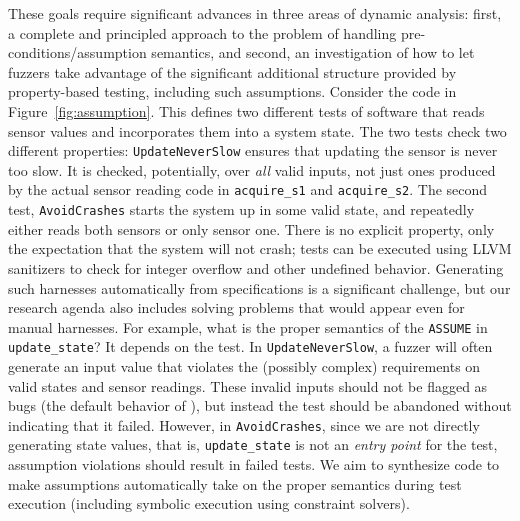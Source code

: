   These goals require significant advances in three areas of dynamic analysis: first, a complete and principled approach to the problem of handling pre-conditions/assumption semantics, and second, an investigation of how to let fuzzers take advantage of the significant additional structure provided by property-based testing, including such assumptions.  Consider the code in Figure~\ref{fig:assumption}.  This defines two different tests of software that reads sensor values and incorporates them into a system state.  The two tests check two different properties:  {\tt UpdateNeverSlow} ensures that updating the sensor is never too slow.  It is checked, potentially, over \emph{all} valid inputs, not just ones produced by the actual sensor reading code in {\tt acquire\_s1} and {\tt acquire\_s2}.  The second test, {\tt AvoidCrashes} starts the system up in some valid state, and repeatedly either reads both sensors or only sensor one.  There is no explicit property, only the expectation that the system will not crash; tests can be executed using LLVM sanitizers to check for integer overflow and other undefined behavior.  Generating such harnesses automatically from \acsl specifications is a significant challenge, but our research agenda also includes solving problems that would appear even for manual harnesses.  For example, what is the proper semantics of the {\tt ASSUME} in {\tt update\_state}?  It depends on the test.  In {\tt UpdateNeverSlow}, a fuzzer will often generate an input value that violates the (possibly complex) requirements on valid states and sensor readings.  These invalid inputs should not be flagged as bugs (the default behavior of \eacsl), but instead the test should be abandoned without indicating that it failed.  However, in {\tt AvoidCrashes}, since we are not directly generating state values, that is, {\tt update\_state} is not an \emph{entry point} for the test, assumption violations should result in failed tests.  We aim to synthesize code to make assumptions automatically take on the proper semantics during test execution (including symbolic execution using constraint solvers).

